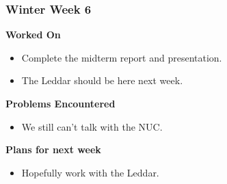 \documentclass[compsoc,draftclsnofoot,onecolumn,10pt]{IEEEtran}
\begin{document}
\subsubsection*{Winter Week 6}
\textbf{Worked On}
\begin{itemize}
    \item Complete the midterm report and presentation.
    \item The Leddar should be here next week.
\end{itemize}
\textbf{Problems Encountered}
\begin{itemize}
    \item We still can't talk with the NUC.
\end{itemize}
\textbf{Plans for next week}
\begin{itemize}
    \item Hopefully work with the Leddar.
\end{itemize}
\end{document}

